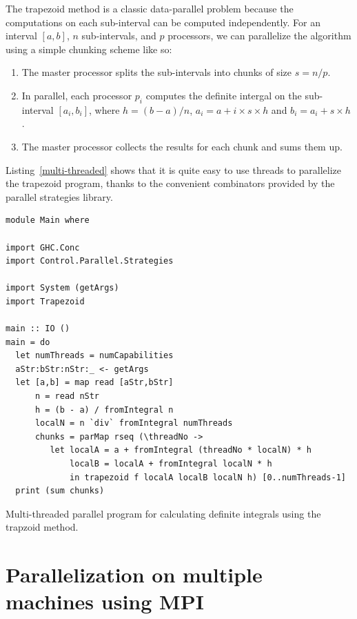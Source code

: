 \documentclass{tmr}
\begin{document}
The trapezoid method is a classic data-parallel problem because
the computations on each sub-interval can be computed independently.
For an interval $[a,b]$, $n$ sub-intervals, and $p$ processors, we can parallelize
the algorithm using a simple chunking scheme like so:
\begin{enumerate}
   \item The master processor splits the sub-intervals into chunks of size $s = n/p$.
   \item In parallel, each processor $p_i$ computes the definite intergal on the sub-interval 
         $[a_i, b_i]$, where $h = (b - a)/n$, $a_i = a + i \times s \times h$ and
         $b_i = a_i + s \times h$.
   \item The master processor collects the results for each chunk and sums them up.
\end{enumerate}
Listing~\ref{multi-threaded} shows that it is quite easy to use threads to
parallelize the trapezoid program, thanks to the convenient combinators provided by the
parallel strategies library.

\begin{listing}
\begin{Verbatim}
module Main where

import GHC.Conc
import Control.Parallel.Strategies

import System (getArgs)
import Trapezoid

main :: IO ()
main = do
  let numThreads = numCapabilities
  aStr:bStr:nStr:_ <- getArgs
  let [a,b] = map read [aStr,bStr]
      n = read nStr
      h = (b - a) / fromIntegral n
      localN = n `div` fromIntegral numThreads
      chunks = parMap rseq (\threadNo ->
         let localA = a + fromIntegral (threadNo * localN) * h
             localB = localA + fromIntegral localN * h
             in trapezoid f localA localB localN h) [0..numThreads-1]
  print (sum chunks)
\end{Verbatim}
\caption{Multi-threaded parallel program for calculating definite integrals using the trapzoid method. \label{multi-threaded}}
\end{listing}


\section{Parallelization on multiple machines using MPI}
\end{document}
